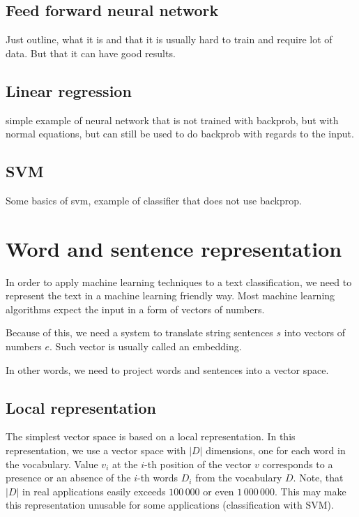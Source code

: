     \subsection{Feed forward neural network}
    Just outline, what it is and that it is usually hard to train and require lot of data. 
    But that it can have good results.
    
    \subsection{Linear regression}
    simple example of neural network that is not trained with backprob, but with normal equations,  
        but can still be used to do backprob with regards to the input.
    
    \subsection{SVM}
    \* %
    Some basics of svm, example of classifier that does not use backprop.
    
    
\section{Word and sentence representation}

    In order to apply machine learning techniques to a text classification, 
    we need to represent the text in a machine learning friendly way.
    Most machine learning algorithms expect the input in a form of vectors of numbers. 
    
    Because of this, we need a system to translate string sentences $s$ into vectors of numbers $e$.
    Such vector is usually called an embedding. 
    
    In  other words, we need to project words and sentences into a vector space.
    
    \subsection{Local representation}
    
    The simplest vector space is based on a local representation.
    In this representation, we use a vector space with $|D|$ dimensions, one for each word in the vocabulary.
    Value $v_i$ at the $i$-th position of the vector $v$ corresponds to a presence or an absence of the $i$-th words $D_i$ from the vocabulary $D$.
    Note, that $|D|$ in real applications easily exceeds $100\,000$ or even $1\,000\,000$.
    This may make this representation unusable for some applications (classification with SVM).
    
